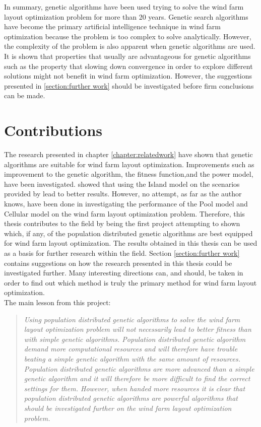 \noindent In summary, genetic algorithms have been used trying to solve the wind farm layout optimization problem for more than 20 years. Genetic search algorithms have become the primary artificial intelligence technique in wind farm optimization because the problem is too complex to solve analytically. However, the complexity of the problem is also apparent when genetic algorithms are used. It is shown that properties that usually are advantageous for genetic algorithms such as the property that slowing down convergence in order to explore different solutions might not benefit in wind farm optimization. However, the suggestions presented in \ref{section:further work} should be investigated before firm conclusions can be made.\\


\section{Contributions}\label{section:contributions}


The research presented in chapter \ref{chapter:relatedwork} have shown that genetic algorithms are suitable for wind farm layout optimization. Improvements such as improvement to the genetic algorithm, the fitness function,and the power model, have been investigated. \citep{Grady} showed that using the Island model on the scenarios provided by \citep{Mosetti} lead to better results. However, no attempt, as far as the author knows, have been done in investigating the performance of the Pool model and Cellular model on the wind farm layout optimization problem. Therefore, this thesis contributes to the field by being the first project attempting to shown which, if any, of the population distributed genetic algorithms are best equipped for wind farm layout optimization. The results obtained in this thesis can be used as a basis for further research within the field. Section \ref{section:further work} contains suggestions on how the research presented in this thesis could be investigated further. Many interesting directions can, and should, be taken in order to find out which method is truly the primary method for wind farm layout optimization.\\


\noindent The main lesson from this project:\\


\begin{quote}
\textit{Using population distributed genetic algorithms to solve the wind farm layout optimization problem will not necessarily lead to better fitness than with simple genetic algorithms. Population distributed genetic algorithm demand more computational resources and will therefore have trouble beating a simple genetic algorithm with the same amount of resources. Population distributed genetic algorithms are more advanced than a simple genetic algorithm and it will therefore be more difficult to find the correct settings for them. However, when handed more resources it is clear that population distributed genetic algorithms are powerful algorithms that should be investigated further on the wind farm layout optimization problem.}
\end{quote}


